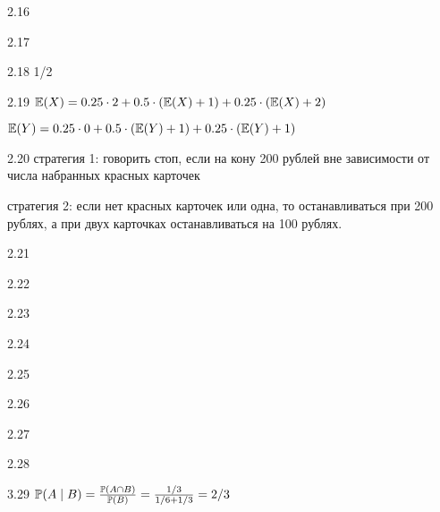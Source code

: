 \protect \hypertarget {soln:2.16}{}
\begin{solution}{{2.16}}
\end{solution}
\protect \hypertarget {soln:2.17}{}
\begin{solution}{{2.17}}
\end{solution}
\protect \hypertarget {soln:2.18}{}
\begin{solution}{{2.18}}
  1/2
\end{solution}
\protect \hypertarget {soln:2.19}{}
\begin{solution}{{2.19}}
  $\E(X)=0.25\cdot 2 + 0.5\cdot (\E(X)+1)+0.25\cdot (\E(X)+2)$

  $\E(Y)=0.25\cdot 0 + 0.5\cdot (\E(Y)+1)+0.25\cdot (\E(Y)+1)$
\end{solution}
\protect \hypertarget {soln:2.20}{}
\begin{solution}{{2.20}}
стратегия 1: говорить стоп, если на кону 200 рублей вне зависимости от числа набранных красных карточек

 стратегия 2: если нет красных карточек или одна, то останавливаться при 200 рублях, а при двух карточках останавливаться на 100 рублях.
\end{solution}
\protect \hypertarget {soln:2.21}{}
\begin{solution}{{2.21}}
\end{solution}
\protect \hypertarget {soln:2.22}{}
\begin{solution}{{2.22}}
\end{solution}
\protect \hypertarget {soln:2.23}{}
\begin{solution}{{2.23}}
\end{solution}
\protect \hypertarget {soln:2.24}{}
\begin{solution}{{2.24}}
\end{solution}
\protect \hypertarget {soln:2.25}{}
\begin{solution}{{2.25}}
\end{solution}
\protect \hypertarget {soln:2.26}{}
\begin{solution}{{2.26}}
\end{solution}
\protect \hypertarget {soln:2.27}{}
\begin{solution}{{2.27}}
\end{solution}
\protect \hypertarget {soln:2.28}{}
\begin{solution}{{2.28}}
\end{solution}
\protect \hypertarget {soln:3.29}{}
\begin{solution}{{3.29}}
  $\P(A\mid B)=\frac{\P(A \cap B)}{\P(B)}= \frac{1/3}{1/6+1/3}=2/3$
\end{solution}
